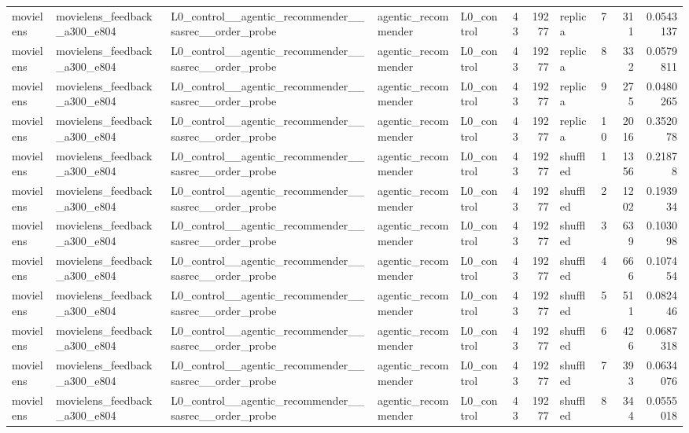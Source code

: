\begin{table}[htbp!]
\begin{tabular}{lllllrrlrrr}
movielens & movielens\_feedback\_a300\_e804 & L0\_control\_\_agentic\_recommender\_\_sasrec\_\_order\_probe & agentic\_recommender & L0\_control & 43 & 19277 & replica & 7 & 311 & 0.0543137 \\
movielens & movielens\_feedback\_a300\_e804 & L0\_control\_\_agentic\_recommender\_\_sasrec\_\_order\_probe & agentic\_recommender & L0\_control & 43 & 19277 & replica & 8 & 332 & 0.0579811 \\
movielens & movielens\_feedback\_a300\_e804 & L0\_control\_\_agentic\_recommender\_\_sasrec\_\_order\_probe & agentic\_recommender & L0\_control & 43 & 19277 & replica & 9 & 275 & 0.0480265 \\
movielens & movielens\_feedback\_a300\_e804 & L0\_control\_\_agentic\_recommender\_\_sasrec\_\_order\_probe & agentic\_recommender & L0\_control & 43 & 19277 & replica & 10 & 2016 & 0.352078 \\
movielens & movielens\_feedback\_a300\_e804 & L0\_control\_\_agentic\_recommender\_\_sasrec\_\_order\_probe & agentic\_recommender & L0\_control & 43 & 19277 & shuffled & 1 & 1356 & 0.21878 \\
movielens & movielens\_feedback\_a300\_e804 & L0\_control\_\_agentic\_recommender\_\_sasrec\_\_order\_probe & agentic\_recommender & L0\_control & 43 & 19277 & shuffled & 2 & 1202 & 0.193934 \\
movielens & movielens\_feedback\_a300\_e804 & L0\_control\_\_agentic\_recommender\_\_sasrec\_\_order\_probe & agentic\_recommender & L0\_control & 43 & 19277 & shuffled & 3 & 639 & 0.103098 \\
movielens & movielens\_feedback\_a300\_e804 & L0\_control\_\_agentic\_recommender\_\_sasrec\_\_order\_probe & agentic\_recommender & L0\_control & 43 & 19277 & shuffled & 4 & 666 & 0.107454 \\
movielens & movielens\_feedback\_a300\_e804 & L0\_control\_\_agentic\_recommender\_\_sasrec\_\_order\_probe & agentic\_recommender & L0\_control & 43 & 19277 & shuffled & 5 & 511 & 0.082446 \\
movielens & movielens\_feedback\_a300\_e804 & L0\_control\_\_agentic\_recommender\_\_sasrec\_\_order\_probe & agentic\_recommender & L0\_control & 43 & 19277 & shuffled & 6 & 426 & 0.0687318 \\
movielens & movielens\_feedback\_a300\_e804 & L0\_control\_\_agentic\_recommender\_\_sasrec\_\_order\_probe & agentic\_recommender & L0\_control & 43 & 19277 & shuffled & 7 & 393 & 0.0634076 \\
movielens & movielens\_feedback\_a300\_e804 & L0\_control\_\_agentic\_recommender\_\_sasrec\_\_order\_probe & agentic\_recommender & L0\_control & 43 & 19277 & shuffled & 8 & 344 & 0.0555018 \\

\end{tabular}
\end{table}
